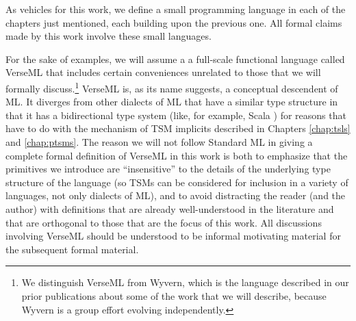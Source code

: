 As vehicles for this work, we define a small programming language in each of the chapters just mentioned, each building upon the previous one. All formal claims made by this work involve these small languages.

For the sake of examples, we will assume a  a full-scale functional language called VerseML that includes certain conveniences unrelated to those that we will formally discuss.\footnote{We distinguish VerseML from Wyvern, which is the language described in our prior publications about some of the work that we will describe, because Wyvern is a group effort evolving independently.} VerseML is, as its name suggests, a conceptual descendent of ML. It diverges from other dialects of ML that have a similar type structure in that it has a bidirectional type system \cite{Pierce:2000:LTI:345099.345100} (like, for example, Scala \cite{OdeZenZen01}) for reasons that have to do with the mechanism of TSM implicits described in Chapters \ref{chap:tsls} and \ref{chap:ptsms}. The reason we will not follow Standard ML \cite{mthm97-for-dart} in giving a complete formal definition of VerseML in this work is both to emphasize that the primitives we introduce are ``insensitive'' to the details of the underlying type structure of the language (so TSMs can be considered for inclusion in a variety of languages, not only dialects of ML), and to avoid distracting the reader (and the author) with definitions that are already well-understood in the literature and that are orthogonal to those that are the focus of this work. All discussions involving VerseML should be understood to be informal motivating material for the subsequent formal material. %



